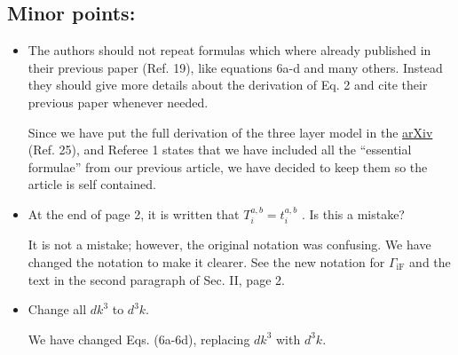 \documentclass[11pt]{article}
\begin{document}
\subsection{Minor points:}

\begin{itemize}

\item
The authors should not repeat formulas which where already published in their
previous paper (Ref. 19), like equations 6a-d and many others. Instead they
should give more details about the derivation of Eq. 2 and cite their previous
paper whenever needed.
\begin{shaded}\label{ref2.03}
Since we have put the full derivation of the three layer model in the
\href{https://arxiv.org/abs/1604.07722}{arXiv} (Ref. 25), and Referee 1 states
that we have included all the ``essential formulae'' from our previous article,
we have decided to keep them so the article is self contained.
\end{shaded}

\item
At the end of page 2, it is written that $T^{a,b}_{i} = t^{a,b}_{i}$ . Is this a
mistake?
\begin{shaded}\label{ref2.04}
It is not a mistake; however, the original notation was confusing. We have
changed the notation to make it clearer. See the new notation for
$\Gamma_{\mathrm{iF}}$ and the text in the second paragraph of Sec. II, page 2.
\end{shaded}

\item
Change all $dk^{3}$ to $d^{3}k$.
\begin{shaded}\label{ref2.05}
We have changed Eqs. (6a-6d), replacing $dk^{3}$ with $d^{3}k$.
\end{shaded}

\end{itemize}
\end{document}
